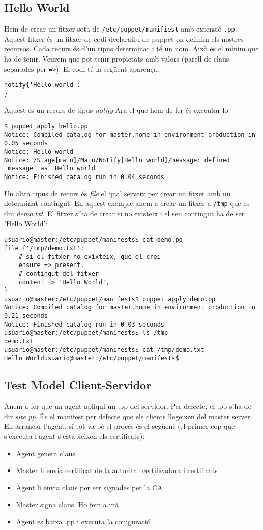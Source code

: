\documentclass[a4paper]{article}
\begin{document}
\subsection{Hello World}
Hem de crear un fitxer sota de \verb+/etc/puppet/manifiest+ amb extensió \verb+.pp+. Aquest fitxer \'es un fitxer de codi declaratiu de puppet on definim els nostres recursos. Cada recurs \'es d'un tipus determinat i t\'e un nom. Això \'es el mínim que ha de tenir. Veurem que pot tenir propietats amb valors (parell de claus separades per \verb+=>+). El codi t\'e la següent aparença:
\begin{verbatim}
notify{'Hello world':
}
\end{verbatim}
Aquest \'es un recurs de tipus \textit{notify} Ara el que hem de fer \'es executar-lo:
\begin{verbatim}
$ puppet apply hello.pp
Notice: Compiled catalog for master.home in environment production in 0.05 seconds
Notice: Hello world
Notice: /Stage[main]/Main/Notify[Hello world]/message: defined 'message' as 'Hello world'
Notice: Finished catalog run in 0.04 seconds
\end{verbatim}
Un altra tipus de recurs \'es \textit{file} el qual serveix per crear un fitxer amb un determinat contingut. En aquest exemple anem a crear un fitxer a \verb+/tmp+ que es diu \textit{demo.txt}. El fitxer s'ha de crear si no existeix i el seu contingut ha de ser 'Hello World':
\begin{verbatim}
usuario@master:/etc/puppet/manifests$ cat demo.pp 
file {'/tmp/demo.txt':
    # si el fitxer no exixteix, que el crei
    ensure => present,
    # contingut del fitxer
    content => 'Hello World',
}
usuario@master:/etc/puppet/manifests$ puppet apply demo.pp 
Notice: Compiled catalog for master.home in environment production in 0.21 seconds
Notice: Finished catalog run in 0.03 seconds
usuario@master:/etc/puppet/manifests$ ls /tmp
demo.txt
usuario@master:/etc/puppet/manifests$ cat /tmp/demo.txt 
Hello Worldusuario@master:/etc/puppet/manifests$ 
\end{verbatim}

\subsection{Test Model Client-Servidor}
Anem a fer que un agent apliqui un .pp del servidor. Per defecte, el .pp s'ha de dir \textit{site.pp}. És el manifest per defecte que els clients llegeixen del master server. En arrancar l'agent, si tot va b\'e el procès \'es el següent (el primer cop que s'executa l'agent s'estableixen els certificats):
\begin{itemize}
	\item Agent genera claus
	\item Master li envia certificat de la autoritat certificadora i certificats
	\item Agent li envia claus per ser signades per la CA
	\item Master signa claus. Ho fem a mà
	\item Agent es baixa .pp i executa la coniguració
\end{itemize}
\end{document}
